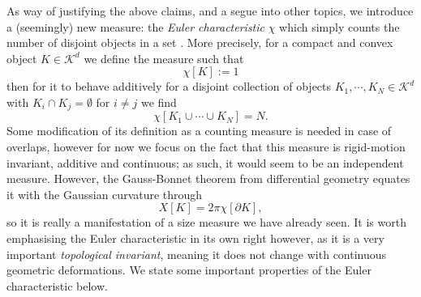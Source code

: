 As way of justifying the above claims, and a segue into other topics, we introduce a (seemingly) new measure: the \emph{Euler characteristic} $\chi$ which simply counts the number of disjoint objects in a set%
.
More precisely, for a compact and convex object $K \in \mathcal{K}^d$ we define the measure such that
\begin{equation*}
  \chi[K] := 1
\end{equation*}
then for it to behave additively for a disjoint collection of objects $K_1, \cdots, K_N \in \mathcal{K}^d$ with $K_i \cap K_j = \emptyset$ for $i \ne j$ we find
\begin{equation*}
  \chi[K_1 \cup \cdots \cup K_N] = N.
\end{equation*}
Some modification of its definition as a counting measure is needed in case of overlaps, however for now we focus on the fact that this measure is rigid-motion invariant, additive and continuous; as such, it would seem to be an independent measure.
However, the Gauss-Bonnet theorem from differential geometry equates it with the Gaussian curvature through
\begin{equation}\label{eq:gauss-bonnet}
  X[K] = 2\pi \chi[\partial K],
\end{equation}
so it is really a manifestation of a size measure we have already seen.
It is worth emphasising the Euler characteristic in its own right however, as it is a very important \emph{topological invariant}, meaning it does not change with continuous geometric deformations.
We state some important properties of the Euler characteristic below.

